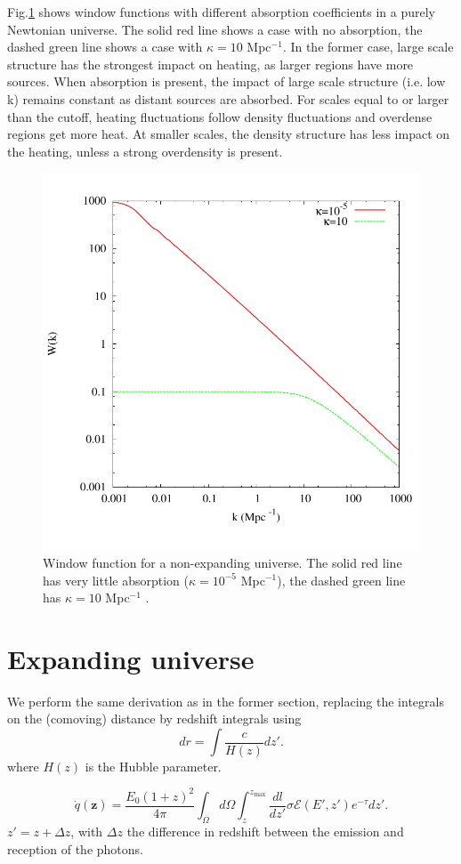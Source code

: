 \documentclass[twocolumns]{emulateapj}
\begin{document}
Fig.\ref{fig:window_newt} shows  window functions with different absorption coefficients in a purely Newtonian universe. The solid red line shows a case with no absorption, the dashed green line shows a case with $\kappa=10$ Mpc$^{-1}$.  In the former case, large scale structure has the strongest impact on heating, as larger regions have more sources. When absorption is present,  the impact of large scale structure (i.e. low k) remains constant as distant sources are absorbed. For scales equal to or larger than the cutoff, heating fluctuations follow density fluctuations and overdense regions get more heat. At smaller scales, the density structure has less impact on the heating, unless a strong overdensity is present.  

\begin{figure}
  \centering
  \includegraphics[width = .45\textwidth ]{newtonian_window-eps-converted-to}
  \caption{Window function for a non-expanding universe. The solid red line has very little absorption ($\kappa=10^{-5}$ Mpc$^{-1}$), the dashed green line has $\kappa=10 $ Mpc$^{-1}$ .}
  \label{fig:window_newt}
\end{figure}



\section{Expanding universe}\label{sec:window_exp}

We perform the same derivation as in the former section, replacing the integrals on the (comoving) distance by redshift integrals using
\begin{equation}
  \label{eq:proper_dist}
  dr=\int \frac{c}{H(z)} dz'.
\end{equation}
where  $H(z)$ is the Hubble parameter.


\begin{equation}
  \label{eq:int_exp_heat}
  \dot{q}(\mathbf{z})=\frac{E_0(1+z)^2}{4\pi}\int_{\Omega}d\Omega\int_z^{z_{\mathrm{max}}}\frac{dl}{dz'}\sigma\mathcal{E}(E',z') e^{-\tau} dz'.
\end{equation}
 $z'=z+\Delta z$, with $\Delta z$ the difference in redshift between the emission and reception of the photons.
\end{document}
